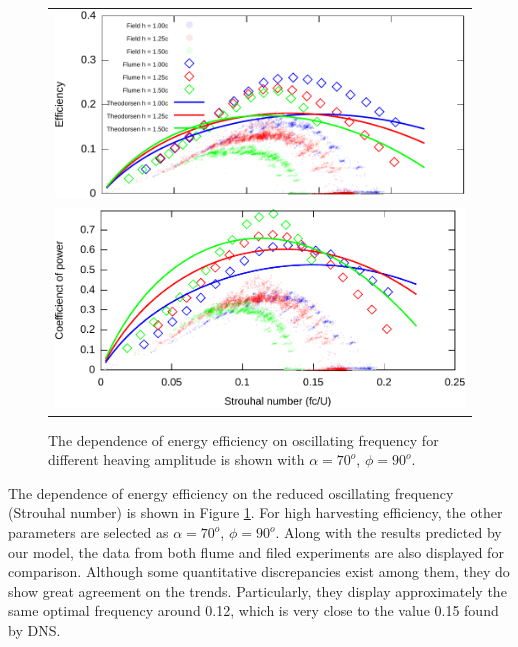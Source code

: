 \begin{figure}
\begin{center}
\begin{tabular}{c}
\includegraphics[width=14cm]{./Figures/Strouhal_vs_Efficiency.pdf} \\
\includegraphics[width=14.5cm]{./Figures/Strouhal_vs_Cp.pdf}
\end{tabular}
\end{center}
\caption[The optimal energy efficient for different stroke frequencies]{The dependence of energy efficiency on oscillating frequency for different heaving amplitude is shown with $\alpha = 70^o$, $\phi = 90^o$. }
\label{fig:Strouhal}
\end{figure}

The dependence of energy efficiency on the reduced oscillating frequency (Strouhal number) is shown in Figure \ref{fig:Strouhal}.
For high harvesting efficiency, the other parameters are selected as $\alpha = 70^o$, $\phi = 90^o$.
Along with the results predicted by our model, the data from both flume and filed experiments are also displayed for comparison.
Although some quantitative discrepancies exist among them, they do show great agreement on the trends.
Particularly, they display approximately the same optimal frequency around 0.12, which is very close to the value 0.15 found by DNS.

